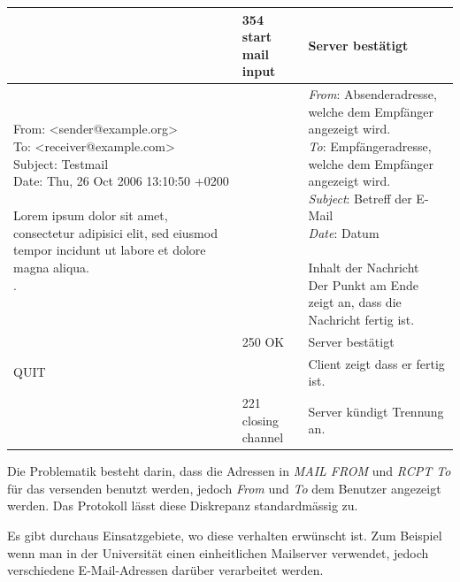 \begin{center}
\begin{tabular}{ | p{5cm} | p{2cm} | p{6cm} |}
		& 354 start mail input & Server bestätigt\\ \hline
		
		\parbox[t]{5cm}{From: <sender@example.org>\\
		To: <receiver@example.com>\\
		Subject: Testmail\\
		Date: Thu, 26 Oct 2006 13:10:50 +0200\\
		\\
		Lorem ipsum dolor sit amet, consectetur adipisici elit, sed eiusmod tempor incidunt ut labore et dolore magna aliqua.\\
		.} &  
		& 
		\parbox[t]{6cm}{
		\textit{From}: Absenderadresse, welche dem Empfänger angezeigt wird.\\
		\textit{To}: Empfängeradresse, welche dem Empfänger angezeigt wird.\\
		\textit{Subject}: Betreff der E-Mail\\
		\textit{Date}: Datum\\
		\\
		Inhalt der Nachricht\\
		Der Punkt am Ende zeigt an, dass die Nachricht fertig ist.
		}\\ \hline
				
		& 250 OK & Server bestätigt\\ \hline
		
		QUIT &  & Client zeigt dass er fertig ist.\\ \hline

		& 221 closing channel & Server kündigt Trennung an.\\ \hline
    \end{tabular}
\end{center}

Die Problematik besteht darin, dass die Adressen in \textit{MAIL FROM} und \textit{RCPT To} für das versenden benutzt werden, jedoch \textit{From} und \textit{To} dem Benutzer angezeigt werden. Das Protokoll lässt diese Diskrepanz standardmässig zu.

Es gibt durchaus Einsatzgebiete, wo diese verhalten erwünscht ist. Zum Beispiel wenn man in der Universität einen einheitlichen Mailserver verwendet, jedoch verschiedene E-Mail-Adressen darüber verarbeitet werden.

